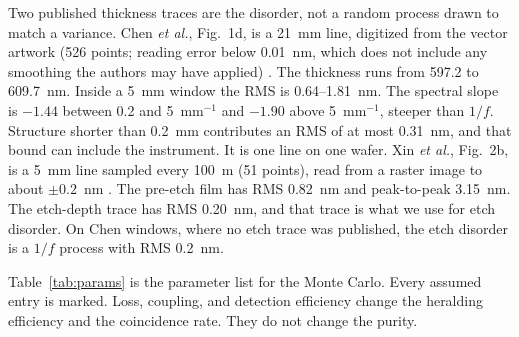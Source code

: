 \documentclass[11pt,a4paper]{article}
\begin{document}
Two published thickness traces are the disorder, not a random process drawn to match a variance.
Chen \emph{et al.}, Fig.~1d, is a 21~mm line, digitized from the vector artwork (526 points; reading error below 0.01~nm, which does not include any smoothing the authors may have applied) \cite{Chen2024}.
The thickness runs from 597.2 to 609.7~nm.
Inside a 5~mm window the RMS is 0.64--1.81~nm.
The spectral slope is $-1.44$ between 0.2 and 5~mm$^{-1}$ and $-1.90$ above 5~mm$^{-1}$, steeper than $1/f$.
Structure shorter than 0.2~mm contributes an RMS of at most 0.31~nm, and that bound can include the instrument.
It is one line on one wafer.
Xin \emph{et al.}, Fig.~2b, is a 5~mm line sampled every 100~\textmu m (51 points), read from a raster image to about $\pm 0.2$~nm \cite{Xin2025}.
The pre-etch film has RMS 0.82~nm and peak-to-peak 3.15~nm.
The etch-depth trace has RMS 0.20~nm, and that trace is what we use for etch disorder.
On Chen windows, where no etch trace was published, the etch disorder is a $1/f$ process with RMS 0.2~nm.

Table~\ref{tab:params} is the parameter list for the Monte Carlo.
Every assumed entry is marked.
Loss, coupling, and detection efficiency change the heralding efficiency and the coincidence rate.
They do not change the purity.
\end{document}
